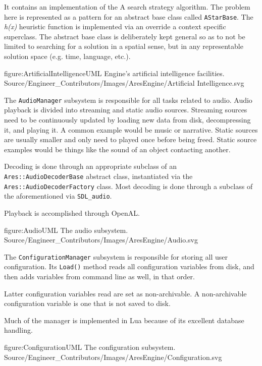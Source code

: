 It contains an implementation of the A\high{*} search strategy algorithm. The problem here is represented as a pattern for an abstract base class called {\tt AStarBase}. The {\it h(x)} heuristic function is implemented via an override a context specific superclass. The abstract base class is deliberately kept general so as to not be limited to searching for a solution in a spatial sense, but in any representable solution space (e.g. time, language, etc.).

\FullPageDiagram
    {figure:ArtificialIntelligenceUML}
    {Engine's artificial intelligence facilities.}
    {Source/Engineer_Contributors/Images/AresEngine/Artificial Intelligence.svg}

\page
{}
The {\tt AudioManager} subsystem is responsible for all tasks related to audio. Audio playback is divided into streaming and static audio sources. Streaming sources need to be continuously updated by loading new data from disk, decompressing it, and playing it. A common example would be music or narrative. Static sources are usually smaller and only need to played once before being freed. Static source examples would be things like the sound of an object contacting another.

Decoding is done through an appropriate subclass of an {\tt Ares::AudioDecoderBase} abstract class, instantiated via the {\tt Ares::AudioDecoderFactory} class. Most decoding is done through a subclass of the aforementioned via {\tt SDL_audio}.

Playback is accomplished through OpenAL.

\FullPageDiagram
    {figure:AudioUML}
    {The audio subsystem.}
    {Source/Engineer_Contributors/Images/AresEngine/Audio.svg}

\page
{}
The {\tt ConfigurationManager} subsystem is responsible for storing all user configuration. Its {\tt Load()} method reads all configuration variables from disk, and then adds variables from command line as well, in that order. 

Latter configuration variables read are set as non-archivable. A non-archivable configuration variable is one that is not saved to disk.

Much of the manager is implemented in Lua because of its excellent database handling.

\FullPageDiagram
    {figure:ConfigurationUML}
    {The configuration subsystem.}
    {Source/Engineer_Contributors/Images/AresEngine/Configuration.svg}

